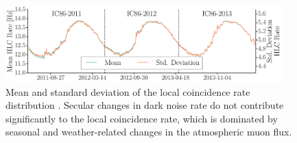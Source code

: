 \begin{figure}[!h]
 \centering
 \includegraphics[width=0.95\textwidth]{graphics/dom/performance/darknoise/HLC_Whole_Detector_Mean_Variance_IC86_2011_2012_2013.pdf}
 \caption{Mean and standard deviation of the local coincidence rate distribution
   \cite{briedel_phd}.  Secular changes in dark noise rate do not
   contribute significantly to the local coincidence rate,
  which is dominated by seasonal and weather-related
   changes in the atmospheric muon flux.} 
 \label{fig:hlc_over_time_briedel}
\end{figure}




